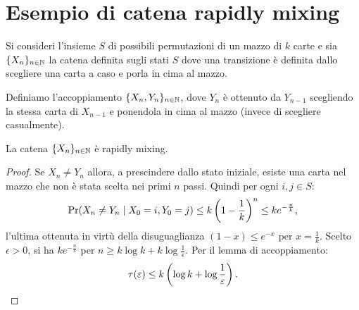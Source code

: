\section{Esempio di catena rapidly mixing}
Si consideri l'insieme $S$ di possibili permutazioni di un mazzo di $k$ carte e sia $\chain X$ la catena definita sugli stati $S$ dove una transizione è definita dallo scegliere una carta a caso e porla in cima al mazzo.

Definiamo l'accoppiamento $\{X_n,Y_n\}_{n\in\N}$, dove $Y_n$ è ottenuto da $Y_{n-1}$ scegliendo la stessa carta di $X_{n-1}$ e ponendola in cima al mazzo (invece di scegliere casualmente).

\begin{thm}
	La catena $\chain X$ è rapidly mixing.
\end{thm}
\begin{proof}
	Se $X_n\ne Y_n$ allora, a prescindere dallo stato iniziale, esiste una carta nel mazzo che non è stata scelta nei primi $n$ passi. Quindi per ogni $i,j\in S$:
	\begin{equation*}
		\Pr(X_n\ne Y_n\mid X_0=i,Y_0=j) \le k\left(1-\frac 1k\right)^n \le ke^{-\frac nk} \text,
	\end{equation*}
	l'ultima ottenuta in virtù della disuguaglianza $(1-x)\le e^{-x}$ per $x=\frac 1k$.
	Scelto $\epsilon>0$, si ha $ke^{-\frac nk}$ per $n\ge k\log k+k\log\frac{1}{\epsilon}$. Per il lemma di accoppiamento:
	\begin{equation*}
		\tau(\epsilon)\le k\left(\log k+\log\frac{1}{\epsilon}\right) \text. \qedhere
	\end{equation*}
\end{proof}
